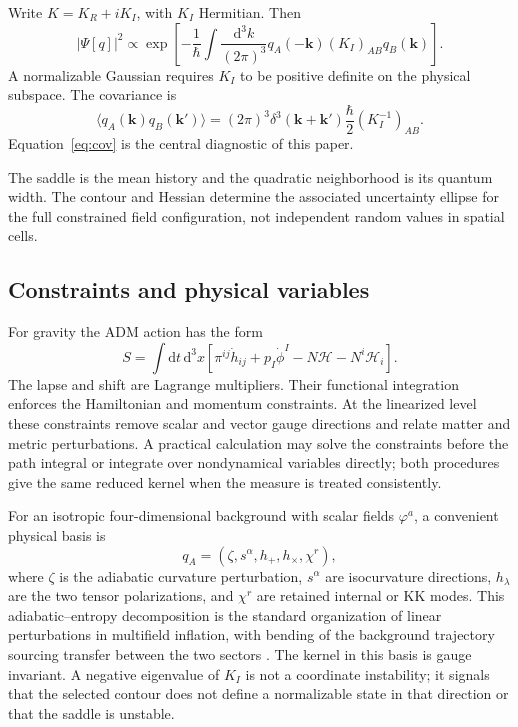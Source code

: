 \documentclass[11pt,a4paper]{article}
\newcommand{\dd}{\mathrm d}
\begin{document}
Write $K=K_R+iK_I$, with $K_I$ Hermitian. Then
\begin{equation}
|\Psi[q]|^2\propto
\exp\left[-\frac1\hbar\int\frac{\dd^3k}{(2\pi)^3}
q_A(-\bm k)(K_I)_{AB}q_B(\bm k)\right].
\end{equation}
A normalizable Gaussian requires $K_I$ to be positive definite on the physical subspace. The covariance is
\begin{equation}
\langle q_A(\bm k)q_B(\bm k')\rangle
=(2\pi)^3\delta^3(\bm k+\bm k')\frac\hbar2(K_I^{-1})_{AB}.
\label{eq:cov}
\end{equation}
Equation~\eqref{eq:cov} is the central diagnostic of this paper.

The saddle is the mean history and the quadratic neighborhood is its quantum width. The contour and Hessian determine the associated uncertainty ellipse for the full constrained field configuration, not independent random values in spatial cells.

\subsection{Constraints and physical variables}
For gravity the ADM action has the form
\begin{equation}
S=\int\dd t\,\dd^3x\left[\pi^{ij}\dot h_{ij}+p_I\dot\phi^I-N\mathcal H-N^i\mathcal H_i\right].
\end{equation}
The lapse and shift are Lagrange multipliers. Their functional integration enforces the Hamiltonian and momentum constraints. At the linearized level these constraints remove scalar and vector gauge directions and relate matter and metric perturbations. A practical calculation may solve the constraints before the path integral or integrate over nondynamical variables directly; both procedures give the same reduced kernel when the measure is treated consistently.

For an isotropic four-dimensional background with scalar fields $\varphi^a$, a convenient physical basis is
\begin{equation}
q_A=(\zeta,s^\alpha,h_+,h_\times,\chi^r),
\end{equation}
where $\zeta$ is the adiabatic curvature perturbation, $s^\alpha$ are isocurvature directions, $h_\lambda$ are the two tensor polarizations, and $\chi^r$ are retained internal or KK modes. This adiabatic--entropy decomposition is the standard organization of linear perturbations in multifield inflation, with bending of the background trajectory sourcing transfer between the two sectors \cite{GordonEtAl2001}. The kernel in this basis is gauge invariant. A negative eigenvalue of $K_I$ is not a coordinate instability; it signals that the selected contour does not define a normalizable state in that direction or that the saddle is unstable.
\end{document}
